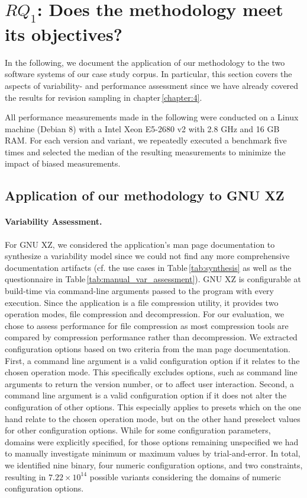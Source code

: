 \section{$RQ_1$: Does the methodology meet its
objectives?}\label{sec:expsetup} In the following, we document the application of our methodology to the two
software systems of our case study corpus. In particular, this section covers
the aspects of variability- and performance assessment since we have already
covered the results for revision sampling in chapter\,\ref{chapter:4}. 

All performance measurements made in the
following were conducted on a Linux machine (Debian 8) with a Intel Xeon
E5-2680 v2 with 2.8 GHz and 16 GB RAM. For each version and variant, we
repeatedly executed  a benchmark five times and selected the median of the
resulting measurements to minimize the impact of biased measurements.

\subsection{Application of our methodology to GNU XZ}
\paragraph{Variability Assessment.} For GNU XZ, we considered the application’s
man page documentation to synthesize a variability model since we could not
find any more comprehensive documentation artifacts (cf. the use cases in
Table\,\ref{tab:synthesis} as well as the questionnaire in
Table\,\ref{tab:manual_var_assessment}).
GNU XZ is configurable at build-time via command-line arguments passed to the program with every execution. Since the application is a file compression utility, it provides two operation modes,
file compression and decompression. For our evaluation, we chose to assess
performance for file compression as most compression tools are compared by
compression performance rather than decompression. We extracted configuration
options based on two criteria from the man page documentation. First, a command
line argument is a valid configuration option if it relates to the chosen
operation mode. This specifically excludes options, such as command line
arguments to return the version number, or to affect user interaction. Second,
a command line argument is a valid configuration option if it does not alter
the configuration of other options. This especially applies to presets which on
the one hand relate to the chosen operation mode, but on the other hand
preselect values for other configuration options. While for some configuration
parameters, domains were explicitly specified, for those options remaining
unspecified we had to manually investigate minimum or maximum values by
trial-and-error. In total, we identified nine binary, four numeric
configuration options, and two constraints, resulting in $7.22 \times 10^{14}$
possible variants considering the domains of numeric configuration options.

